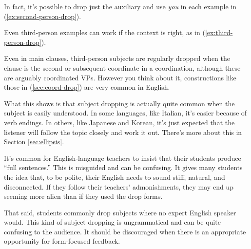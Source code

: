 \ea  \label{ex:second-person-drop}
    \z
\z

In fact, it's possible to drop just the auxiliary and use \textit{you} in each example in (\ref{ex:second-person-drop}).

Even third-person examples can work if the context is right, as in (\ref{ex:third-person-drop}).
\ea  \label{ex:third-person-drop}
    \z
\z

Even in main clauses, third-person subjects are regularly dropped when the clause is the second or subsequent coordinate in a coordination, although these are arguably coordinated VPs. However you think about it, constructions like those in (\ref{sec:coord-drop}) are very common in English.

\ea \label{sec:coord-drop}
    \z
\z

What this shows is that subject dropping is actually quite common when the subject is easily understood. In some languages, like Italian, it's easier because of verb endings. In others, like Japanese and Korean, it's just expected that the listener will follow the topic closely and work it out. There's more about this in  Section \ref{sec:ellipsis}.

It's common for English-language teachers to insist that their students produce ``full sentences.'' This is misguided and can be confusing. It gives many students the idea that, to be polite, their English needs to sound stiff, natural, and disconnected. If they follow their teachers' admonishments, they may end up seeming more alien than if they used the drop forms.

That said, students commonly drop subjects where no expert English speaker would. This kind of subject dropping is ungrammatical and can be quite confusing to the audience. It should be discouraged when there is an appropriate opportunity for form-focused feedback.

